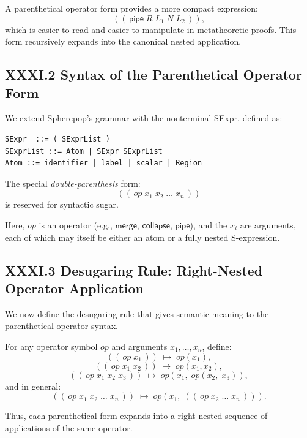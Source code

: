 \documentclass[11pt,letterpaper]{article}
\begin{document}
A parenthetical operator form provides a more compact expression:
\[
((\,\mathsf{pipe}\; R\; L_1\; N\; L_2\,)),
\]
which is easier to read and easier to manipulate in metatheoretic proofs. This form recursively expands into the canonical nested application.

\subsection{XXXI.2 Syntax of the Parenthetical Operator Form}

We extend Spherepop's grammar with the nonterminal \textsf{SExpr}, defined as:

\begin{verbatim}
SExpr  ::= ( SExprList )
SExprList ::= Atom | SExpr SExprList
Atom ::= identifier | label | scalar | Region
\end{verbatim}

The special \emph{double-parenthesis} form:
\[
((\,op\; x_1\; x_2\; \ldots\; x_n\,))
\]
is reserved for syntactic sugar.

Here, $op$ is an operator (e.g., $\mathsf{merge}$, $\mathsf{collapse}$, $\mathsf{pipe}$), and the $x_i$ are arguments, each of which may itself be either an atom or a fully nested S-expression.

\subsection{XXXI.3 Desugaring Rule: Right-Nested Operator Application}

We now define the desugaring rule that gives semantic meaning to the parenthetical operator syntax.

\begin{definition}
For any operator symbol $op$ and arguments $x_1,\ldots,x_n$, define:
\[
((\,op\; x_1\,)) \;\mapsto\; op(x_1),
\]
\[
((\,op\; x_1\; x_2\,)) \;\mapsto\; op(x_1, x_2),
\]
\[
((\,op\; x_1\; x_2\; x_3\,)) \;\mapsto\; op(x_1,\; op(x_2,\; x_3)),
\]
and in general:
\[
((\,op\; x_1\; x_2\; \ldots\; x_n\,)) 
\;\mapsto\;
op(x_1,\; ((\,op\; x_2\; \ldots\; x_n\,))).
\]
\end{definition}

Thus, each parenthetical form expands into a right-nested sequence of applications of the same operator.
\end{document}
